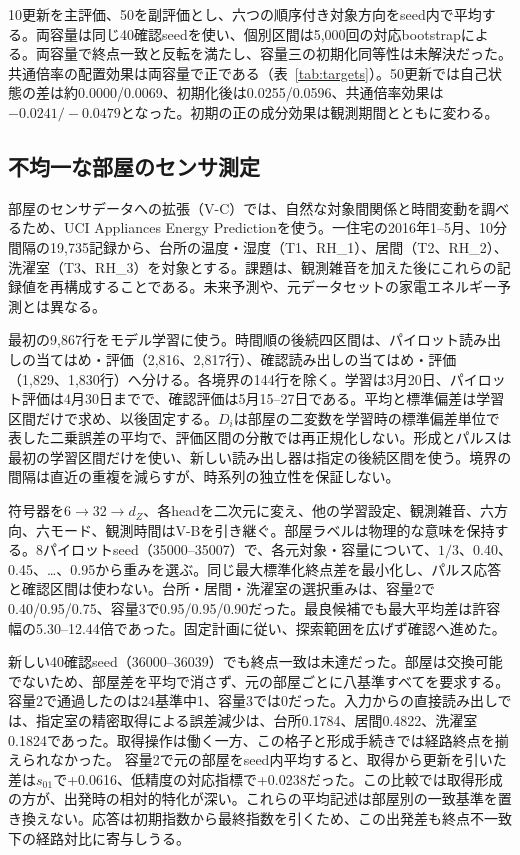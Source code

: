 10更新を主評価、50を副評価とし、六つの順序付き対象方向をseed内で平均する。両容量は同じ40確認seedを使い、個別区間は5,000回の対応bootstrapによる。両容量で終点一致と反転を満たし、容量三の初期化同等性は未解決だった。共通倍率の配置効果は両容量で正である（表~\ref{tab:targets}）。50更新では自己状態の差は約0.0000/0.0069、初期化後は0.0255/0.0596、共通倍率効果は$-0.0241/-0.0479$となった。初期の正の成分効果は観測期間とともに変わる。

\subsection{不均一な部屋のセンサ測定}
\label{app:natural}
部屋のセンサデータへの拡張（V-C）では、自然な対象間関係と時間変動を調べるため、UCI Appliances Energy Predictionを使う\citep{candanedo2017data,candanedo2017dataset}。一住宅の2016年1--5月、10分間隔の19,735記録から、台所の温度・湿度（T1、RH\_1）、居間（T2、RH\_2）、洗濯室（T3、RH\_3）を対象とする。課題は、観測雑音を加えた後にこれらの記録値を再構成することである。未来予測や、元データセットの家電エネルギー予測とは異なる。

最初の9,867行をモデル学習に使う。時間順の後続四区間は、パイロット読み出しの当てはめ・評価（2,816、2,817行）、確認読み出しの当てはめ・評価（1,829、1,830行）へ分ける。各境界の144行を除く。学習は3月20日、パイロット評価は4月30日までで、確認評価は5月15--27日である。平均と標準偏差は学習区間だけで求め、以後固定する。$D_i$は部屋の二変数を学習時の標準偏差単位で表した二乗誤差の平均で、評価区間の分散では再正規化しない。形成とパルスは最初の学習区間だけを使い、新しい読み出し器は指定の後続区間を使う。境界の間隔は直近の重複を減らすが、時系列の独立性を保証しない。

符号器を$6\to32\to d_Z$、各headを二次元に変え、他の学習設定、観測雑音、六方向、六モード、観測時間はV-Bを引き継ぐ。部屋ラベルは物理的な意味を保持する。8パイロットseed（35000--35007）で、各元対象・容量について、$1/3$、0.40、0.45、\ldots、0.95から重みを選ぶ。同じ最大標準化終点差を最小化し、パルス応答と確認区間は使わない。台所・居間・洗濯室の選択重みは、容量2で0.40/0.95/0.75、容量3で0.95/0.95/0.90だった。最良候補でも最大平均差は許容幅の5.30--12.44倍であった。固定計画に従い、探索範囲を広げず確認へ進めた。

新しい40確認seed（36000--36039）でも終点一致は未達だった。部屋は交換可能でないため、部屋差を平均で消さず、元の部屋ごとに八基準すべてを要求する。容量2で通過したのは24基準中1、容量3では0だった。入力からの直接読み出しでは、指定室の精密取得による誤差減少は、台所0.1784、居間0.4822、洗濯室0.1824であった。取得操作は働く一方、この格子と形成手続きでは経路終点を揃えられなかった。 容量2で元の部屋をseed内平均すると、取得から更新を引いた差は$s_{01}$で+0.0616、低精度の対応指標で+0.0238だった。この比較では取得形成の方が、出発時の相対的特化が深い。これらの平均記述は部屋別の一致基準を置き換えない。応答は初期指数から最終指数を引くため、この出発差も終点不一致下の経路対比に寄与しうる。


